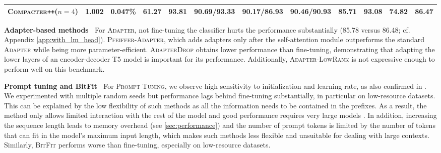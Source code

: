 \documentclass{article}
\newcommand{\adapter}{\textsc{Adapter}\xspace}
\newcommand{\adapterlowrank}{\textsc{Adapter-LowRank}\xspace}
\newcommand{\adapternoclf}{\textsc{Adapter}\xspace}
\newcommand{\compacter}{\textsc{Compacter}\xspace}
\newcommand{\compacteronlyff}{\textsc{Compacter}\texttt{++}\xspace} %
\newcommand{\prompttuning}{\textsc{Prompt Tuning}\xspace}
\newcommand{\pfeifferadapter}{\textsc{Pfeiffer-Adapter}\xspace}
\newcommand{\adapterdrop}{\textsc{AdapterDrop}\xspace}
\newcommand{\bitfit}{\textsc{BitFit}\xspace}
\begin{document}
\begin{table}[tp]
\begin{adjustbox}{max width=\textwidth}
\begin{tabular}{l@{\hskip 0.05in}|l@{\hskip 0.05in}l@{\hskip 0.01in}|l@{\hskip 0.1in}l@{\hskip 0.1in}l@{\hskip 0.1in}l@{\hskip 0.1in}l@{\hskip 0.1in}l@{\hskip 0.1in}l@{\hskip 0.1in}l|l}
\compacteronlyff ($n=4$)& 1.002&  0.047\%&  61.27 &  93.81 &  90.69/93.33 &  90.17/86.93 &  \textbf{90.46/90.93} &  85.71 &  \textbf{93.08} &  74.82 &  86.47 \\ %
\bottomrule
\end{tabular}
\end{adjustbox}
\label{tab:glue_results} \vspace{-1em}
\end{table} 


\noindent \textbf{Adapter-based methods} $\:$ For \adapternoclf, not fine-tuning the classifier hurts the performance substantially (85.78 versus 86.48; cf. Appendix \ref{app:with_lm_head}). \pfeifferadapter, which adds adapters only after the self-attention module outperforms the standard \adapter while being more parameter-efficient. \adapterdrop obtains lower performance than fine-tuning, demonstrating that adapting the lower layers of an encoder-decoder T5 model is important for its performance. Additionally, \adapterlowrank is not expressive enough to perform well on this benchmark.

\noindent \textbf{Prompt tuning and BitFit} $\:$ For \prompttuning, we observe high sensitivity to initialization and learning rate, as also confirmed in \cite{li2021prefix}. We experimented with multiple random seeds but performance lags behind fine-tuning substantially, in particular on low-resource datasets. This can be explained by the low flexibility of such methods as all the information needs to be contained in the prefixes. As a result, the method only allows limited interaction with the rest of the model and good performance requires very large models \citep{lester2021power}. In addition, increasing the sequence length leads to memory overhead (see \textsection \ref{sec:performance}) and the number of prompt tokens is limited by the number of tokens that can fit in the model's maximum input length, which makes such methods less flexible and unsuitable for dealing with large contexts.
Similarly, \bitfit performs worse than fine-tuning, especially on low-resource datasets. 
\end{document}
